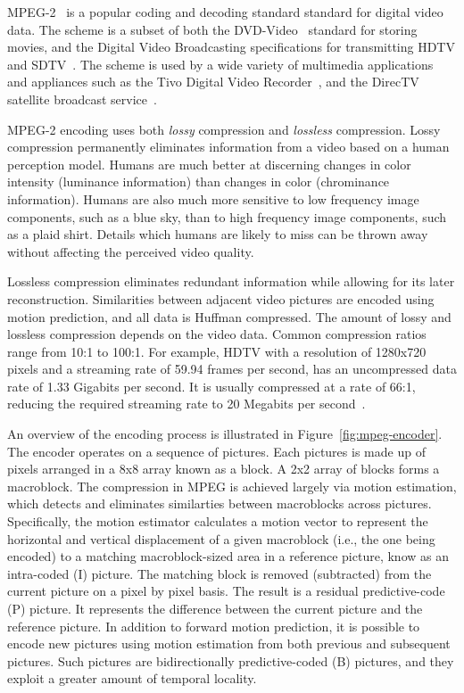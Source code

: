 
MPEG-2~\cite{MPEG2} is a popular coding and decoding standard standard
for digital video data. The scheme is a subset of both the
DVD-Video~\cite{DVDVideo} standard for storing movies, and the Digital
Video Broadcasting specifications for transmitting HDTV and
SDTV~\cite{DVB}. The scheme is used by a wide variety of multimedia
applications and appliances such as the Tivo Digital Video
Recorder~\cite{tivo}, and the DirecTV satellite broadcast
service~\cite{directv}.

MPEG-2 encoding uses both {\it lossy} compression and {\it lossless}
compression. Lossy compression permanently eliminates information from
a video based on a human perception model. Humans are much better at
discerning changes in color intensity (luminance information) than
changes in color (chrominance information). Humans are also much more
sensitive to low frequency image components, such as a blue sky, than
to high frequency image components, such as a plaid shirt. Details
which humans are likely to miss can be thrown away without affecting
the perceived video quality.

Lossless compression eliminates redundant information while allowing
for its later reconstruction. Similarities between adjacent video
pictures are encoded using motion prediction, and all data is Huffman
compressed\cite{Huffman52}. The amount of lossy and lossless
compression depends on the video data. Common compression ratios range
from 10:1 to 100:1. For example, HDTV with a resolution of 1280x720
pixels and a streaming rate of 59.94 frames per second, has an
uncompressed data rate of 1.33 Gigabits per second. It is usually
compressed at a rate of 66:1, reducing the required streaming rate to
20 Megabits per second~\cite{imagevidstandards, Page 3}.


An overview of the encoding process is illustrated in
Figure~\ref{fig:mpeg-encoder}. The encoder operates on a sequence of
pictures. Each pictures is made up of pixels arranged in a 8x8 array
known as a block. A 2x2 array of blocks forms a macroblock. The
compression in MPEG is achieved largely via motion estimation, which
detects and eliminates similarties between macroblocks across
pictures.  Specifically, the motion estimator calculates a motion
vector to represent the horizontal and vertical displacement of a
given macroblock (i.e., the one being encoded) to a matching
macroblock-sized area in a reference picture, know as an intra-coded
(I) picture. The matching block is removed (subtracted) from the
current picture on a pixel by pixel basis. The result is a residual
predictive-code (P) picture. It represents the difference between the
current picture and the reference picture. In addition to forward
motion prediction, it is possible to encode new pictures using motion
estimation from both previous and subsequent pictures. Such pictures
are bidirectionally predictive-coded (B) pictures, and they exploit a
greater amount of temporal locality.


